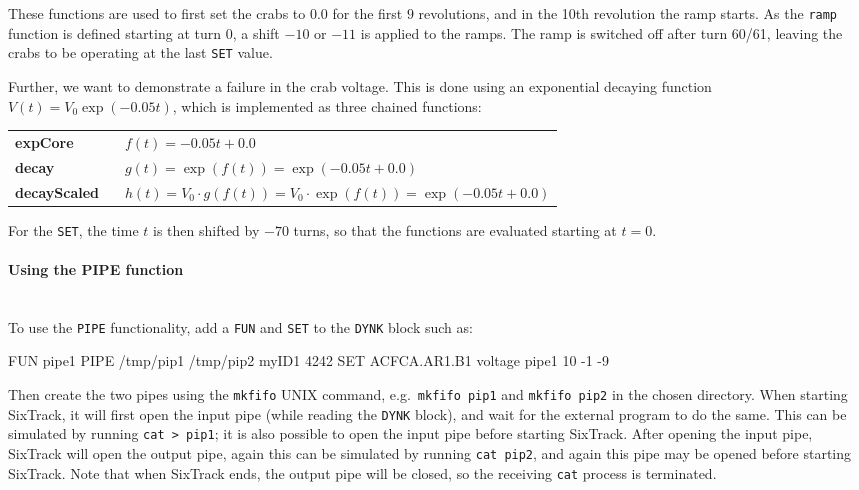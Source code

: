 These functions are used to first set the crabs to $0.0$ for the first $9$ revolutions, and in the 10th revolution the ramp starts.
As the \texttt{ramp} function is defined starting at turn $0$, a shift $-10$ or $-11$ is applied to the ramps.
The ramp is switched off after turn 60/61, leaving the crabs to be operating at the last \texttt{SET} value.

Further, we want to demonstrate a failure in the crab voltage.
This is done using an exponential decaying function $V(t) = V_0 \exp\left(-0.05 t\right)$, which is implemented as three chained functions:

\bigskip
\begin{tabular}{@{}lp{0.8\linewidth}}
    \textbf{expCore}     & $f(t) = -0.05 t + 0.0$ \\
    \textbf{decay}       & $g(t) = \exp(f(t)) = \exp(-0.05 t + 0.0)$ \\
    \textbf{decayScaled} & $h(t) = V_0 \cdot g(f(t)) = V_0 \cdot \exp(f(t)) = \exp(-0.05 t + 0.0)$
\end{tabular}

\bigskip
For the \texttt{SET}, the time $t$ is then shifted by $-70$ turns, so that the functions are evaluated starting at $t=0$.


\paragraph{Using the PIPE function}~\\

To use the \texttt{PIPE} functionality, add a \texttt{FUN} and \texttt{SET} to the \texttt{DYNK} block such as:
\begin{cverbatim}
FUN pipe1 PIPE /tmp/pip1 /tmp/pip2 myID1 4242
SET  ACFCA.AR1.B1 voltage pipe1 10 -1 -9
\end{cverbatim}
Then create the two pipes using the \texttt{mkfifo} UNIX command, e.g.\ \texttt{mkfifo~pip1} and \texttt{mkfifo~pip2} in the chosen directory.
When starting SixTrack, it will first open the input pipe (while reading the \texttt{DYNK} block), and wait for the external program to do the same.
This can be simulated by running \texttt{cat~>~pip1}; it is also possible to open the input pipe before starting SixTrack.
After opening the input pipe, SixTrack will open the output pipe, again this can be simulated by running \texttt{cat~pip2}, and again this pipe may be opened before starting SixTrack.
Note that when SixTrack ends, the output pipe will be closed, so the receiving \texttt{cat} process is terminated.

